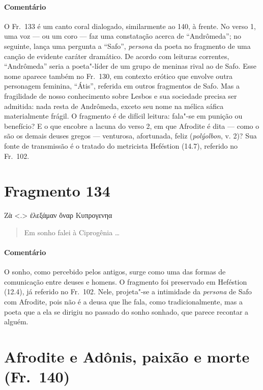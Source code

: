 {\paragraph{Comentário} O Fr.~133 é um canto coral dialogado, similarmente ao 140, à frente. No verso 1, uma voz --- ou um coro --- faz uma constatação acerca de ``Andrômeda”; no seguinte,
lança uma pergunta a ``Safo”, \textit{persona }da poeta no fragmento de
uma canção de evidente caráter dramático. De acordo com leituras correntes,
``Andrômeda” seria a poeta"-líder de um grupo de
meninas rival ao de Safo. Esse nome aparece também no Fr.~130, em contexto
erótico que envolve outra personagem feminina, “Átis”, referida em
outros fragmentos de Safo. Mas a fragilidade de nosso conhecimento sobre Lesbos
e sua sociedade precisa ser admitida: nada resta de Andrômeda, exceto seu nome
na mélica sáfica materialmente frágil. O fragmento é de difícil leitura:
fala"-se em punição ou benefício? E o que encobre a lacuna do verso 2, em que
Afrodite é dita --- como o são os demais deuses gregos --- venturosa, afortunada,
feliz (\textit{polýolbon}, v. 2)? Sua fonte de transmissão é o tratado do metricista Heféstion (14.7), referido
no Fr.~102.}

\pagebreak

\section{Fragmento 134}

\begin{gkverse}
Ζὰ <.> ἐλεξάμαν ὄναρ Κυπρογενηα
\end{gkverse}

\begin{verse}
Em sonho falei à Ciprogênia \ldots{}
\end{verse}

{\paragraph{Comentário} O sonho, como percebido pelos antigos, surge como uma das formas de 
comunicação entre deuses e homens. O fragmento foi preservado em Heféstion (12.4), já
referido no Fr.~102. Nele, projeta"-se a intimidade da \textit{persona} de Safo com Afrodite, pois não é a deusa que lhe fala, como tradicionalmente, mas a poeta que a ela se dirigiu no passado do sonho sonhado, que parece recontar a alguém.}


\pagebreak
\section{Afrodite e Adônis, paixão e morte (Fr.~140)}


